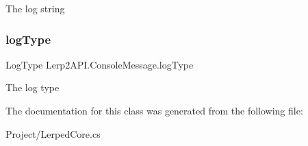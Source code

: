 The log string 

\mbox{\label{class_lerp2_a_p_i_1_1_console_message_aaf16aa394b7815ab52670581601339d3}} 
\subsubsection{\texorpdfstring{log\+Type}{logType}}
{\footnotesize\ttfamily Log\+Type Lerp2\+A\+P\+I.\+Console\+Message.\+log\+Type}



The log type 



The documentation for this class was generated from the following file\+:\begin{DoxyCompactItemize}
\item 
Project/Lerped\+Core.\+cs\end{DoxyCompactItemize}
